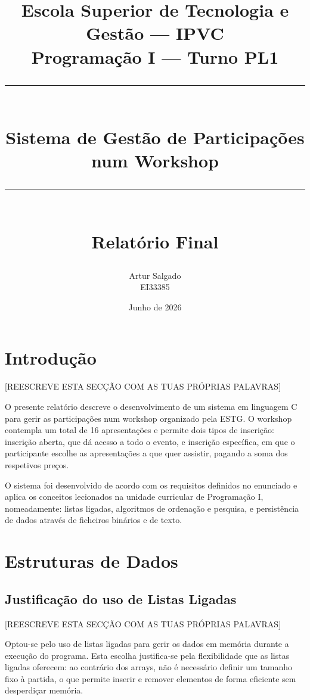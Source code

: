 \documentclass[12pt,a4paper]{article}
\title{
  \vspace{-1cm}
  \Large \textbf{Escola Superior de Tecnologia e Gestão — IPVC} \\[0.5cm]
  \large Programação I — Turno PL1 \\[0.3cm]
  \rule{\linewidth}{0.5pt} \\[0.5cm]
  \LARGE \textbf{Sistema de Gestão de Participações num Workshop} \\[0.3cm]
  \rule{\linewidth}{0.5pt} \\[0.5cm]
  \large Relatório Final
}
\author{
  Artur Salgado \\ EI33385
}
\date{Junho de 2026}
\begin{document}

\maketitle
\thispagestyle{empty}
\newpage

\tableofcontents
\newpage

\section{Introdução}

[REESCREVE ESTA SECÇÃO COM AS TUAS PRÓPRIAS PALAVRAS]

O presente relatório descreve o desenvolvimento de um sistema em linguagem C para gerir as participações num workshop organizado pela ESTG. O workshop contempla um total de 16 apresentações e permite dois tipos de inscrição: inscrição aberta, que dá acesso a todo o evento, e inscrição específica, em que o participante escolhe as apresentações a que quer assistir, pagando a soma dos respetivos preços.

O sistema foi desenvolvido de acordo com os requisitos definidos no enunciado e aplica os conceitos lecionados na unidade curricular de Programação I, nomeadamente: listas ligadas, algoritmos de ordenação e pesquisa, e persistência de dados através de ficheiros binários e de texto.

\section{Estruturas de Dados}

\subsection{Justificação do uso de Listas Ligadas}

[REESCREVE ESTA SECÇÃO COM AS TUAS PRÓPRIAS PALAVRAS]

Optou-se pelo uso de listas ligadas para gerir os dados em memória durante a execução do programa. Esta escolha justifica-se pela flexibilidade que as listas ligadas oferecem: ao contrário dos arrays, não é necessário definir um tamanho fixo à partida, o que permite inserir e remover elementos de forma eficiente sem desperdiçar memória.
\end{document}

